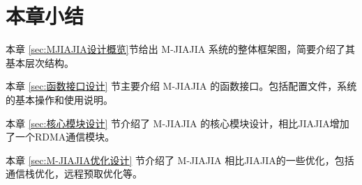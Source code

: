 {    \section{本章小结}
    本章 \ref{sec:MJIAJIA设计概览}节给出 M-JIAJIA 系统的整体框架图，简要介绍了其基本层次结构。

    本章 \ref{sec:函数接口设计} 节主要介绍 M-JIAJIA 的函数接口。包括配置文件，系统的基本操作和使用说明。

    本章 \ref{sec:核心模块设计} 节介绍了 M-JIAJIA 的核心模块设计，相比JIAJIA增加了一个RDMA通信模块。

    本章 \ref{sec:M-JIAJIA优化设计} 节介绍了 M-JIAJIA 相比JIAJIA的一些优化，包括通信栈优化，远程预取优化等。
}
